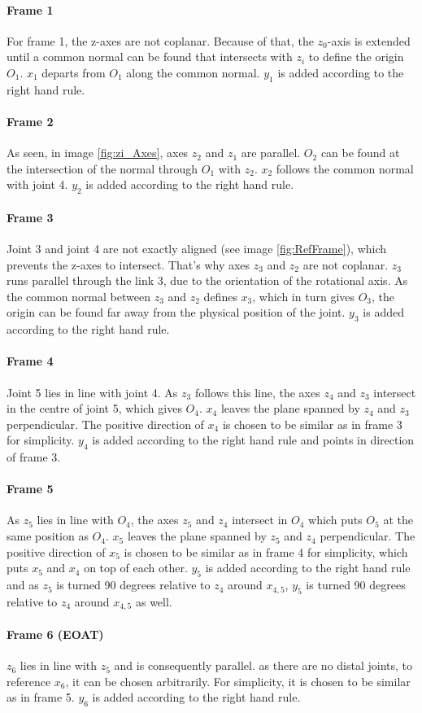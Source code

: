 \paragraph{Frame 1}
For frame 1, the z-axes are not coplanar. 
Because of that, the  $z_0$-axis is extended until a common normal can be found that intersects with $z_i$ to define the origin $O_1$.
$x_1$ departs from $O_1$ along the common normal.
$y_1$ is added according to the right hand rule.

\paragraph{Frame 2}
As seen, in image \ref{fig:zi_Axes}, axes $z_2$ and $z_1$ are parallel. $O_2$ can be found at the intersection of the normal through $O_1$ with $z_2$. $x_2$ follows the common normal with joint 4.
$y_2$ is added according to the right hand rule.

\paragraph{Frame 3}
Joint 3 and joint 4 are not exactly aligned (see image \ref{fig:RefFrame}), which prevents the z-axes to intersect. That's why axes $z_3$ and $z_2$ are not coplanar. 
$z_3$ runs parallel through the link 3, due to the orientation of the rotational axis.
As the common normal between $z_3$ and $z_2$ defines $x_3$, which in turn gives $O_3$, the origin can be found far away from the physical position of the joint.
$y_3$ is added according to the right hand rule.

\paragraph{Frame 4}
Joint 5 lies in line with joint 4.
As $z_3$ follows this line, the axes  $z_4$ and $z_3$ intersect in the centre of joint 5, which gives $O_4$. 
$x_4$ leaves the plane spanned by  $z_4$ and $z_3$ perpendicular.
The positive direction of $x_4$ is chosen to be similar as in frame 3 for simplicity.
$y_4$ is added according to the right hand rule and points in direction of frame 3.

\paragraph{Frame 5}
As $z_5$ lies  in line with $O_4$, the axes  $z_5$ and $z_4$ intersect in $O_4$ which puts $O_5$ at the same position as $O_4$.
$x_5$ leaves the plane spanned by  $z_5$ and $z_4$ perpendicular.
The positive direction of $x_5$ is chosen to be similar as in frame 4 for simplicity, which puts $x_5$ and $x_4$ on top of each other. 
$y_5$ is added according to the right hand rule and as $z_5$ is turned 90 degrees relative to $z_4$ around $x_{4,5}$, $y_5$ is turned 90 degrees relative to $z_4$ around $x_{4,5}$ as well.

\paragraph{Frame 6 (EOAT)}
$z_6$ lies in line with $z_5$ and is consequently parallel.
as there are no distal joints, to reference $x_6$, it can be chosen arbitrarily. 
For simplicity, it is chosen to be similar as in frame 5. 
$y_6$ is added according to the right hand rule.\\
\\

